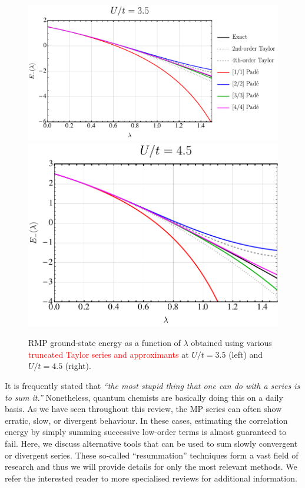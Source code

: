 \documentclass[aps,prb,reprint,noshowkeys,superscriptaddress]{revtex4-1}
\newcommand{\titou}[1]{\textcolor{red}{#1}}
\begin{document}
\begin{figure}
    \includegraphics[height=0.23\textheight]{fig9a}
    \includegraphics[height=0.23\textheight]{fig9b}
    \caption{\label{fig:PadeRMP}
    RMP ground-state energy as a function of $\lambda$ obtained using various \titou{truncated Taylor series and approximants} 
    at $U/t = 3.5$ (left) and $U/t = 4.5$ (right).}
\end{figure}


It is frequently stated that
\textit{``the most stupid thing that one can do with a series is to sum it.''}
Nonetheless, quantum chemists are basically doing this on a daily basis.
As we have seen throughout this review, the MP series can often show erratic, 
slow, or divergent behaviour.
In these cases, estimating the correlation energy by simply summing successive
low-order terms is almost guaranteed to fail.
Here, we discuss alternative tools that can be used to sum slowly convergent or divergent series.
These so-called ``resummation'' techniques form a vast field of research and thus we will
provide details for only the most relevant methods.
We refer the interested reader to more specialised reviews for additional information.%
\cite{Goodson_2011,Goodson_2019}
\end{document}
